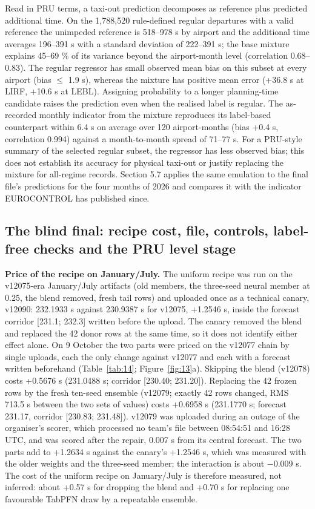 \documentclass[
  manuscript=article,  %
  layout=preprint,     %
  year=2026,
  volume=4,
]{extra/joas}
\begin{document}
Read in PRU terms, a taxi-out prediction decomposes as reference plus predicted additional time. On the 1,788,520 rule-defined regular departures with a valid reference the unimpeded reference is 518--978 s by airport and the additional time averages 196--391 s with a standard deviation of 222--391 s; the base mixture explains 45--69 \% of its variance beyond the airport-month level (correlation 0.68--0.83). The regular regressor has small observed mean bias on this subset at every airport (\textbar bias\textbar{} $\le$ 1.9 s), whereas the mixture has positive mean error (+36.8 s at LIRF, +10.6 s at LEBL). Assigning probability to a longer planning-time candidate raises the prediction even when the realised label is regular. The as-recorded monthly indicator from the mixture reproduces its label-based counterpart within 6.4 s on average over 120 airport-months (bias +0.4 s, correlation 0.994) against a month-to-month spread of 71--77 s. For a PRU-style summary of the selected regular subset, the regressor has less observed bias; this does not establish its accuracy for physical taxi-out or justify replacing the mixture for all-regime records. Section 5.7 applies the same emulation to the final file's predictions for the four months of 2026 and compares it with the indicator EUROCONTROL has published since.

\subsection{The blind final: recipe cost, file, controls, label-free checks and the PRU level stage}\label{the-blind-final-recipe-cost-file-controls-label-free-checks-and-the-pru-level-stage}

\textbf{Price of the recipe on January/July.} The uniform recipe was run on the v12075-era January/July artifacts (old members, the three-seed neural member at 0.25, the blend removed, fresh tail rows) and uploaded once as a technical canary, v12090: 232.1933 s against 230.9387 s for v12075, +1.2546 s, inside the forecast corridor {[}231.1; 232.3{]} written before the upload. The canary removed the blend and replaced the 42 donor rows at the same time, so it does not identify either effect alone. On 9 October the two parts were priced on the v12077 chain by single uploads, each the only change against v12077 and each with a forecast written beforehand (Table~\ref{tab:14}; Figure~\ref{fig:13}a). Skipping the blend (v12078) costs +0.5676 s (231.0488 s; corridor {[}230.40; 231.20{]}). Replacing the 42 frozen rows by the fresh ten-seed ensemble (v12079; exactly 42 rows changed, RMS 713.5 s between the two sets of values) costs +0.6958 s (231.1770 s; forecast 231.17, corridor {[}230.83; 231.48{]}). v12079 was uploaded during an outage of the organiser's scorer, which processed no team's file between 08:54:51 and 16:28 UTC, and was scored after the repair, 0.007 s from its central forecast. The two parts add to +1.2634 s against the canary's +1.2546 s, which was measured with the older weights and the three-seed member; the interaction is about $-$0.009 s. The cost of the uniform recipe on January/July is therefore measured, not inferred: about +0.57 s for dropping the blend and +0.70 s for replacing one favourable TabPFN draw by a repeatable ensemble.
\end{document}
